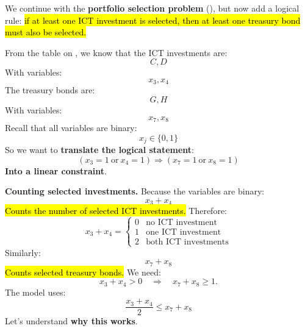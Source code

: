\begin{examplebox}
    We continue with the \textbf{portfolio selection problem} (), but now add a logical rule: \hl{if at least one ICT investment is selected, then at least one treasury bond must also be selected.}

    \highspace
    From the table on , we know that the ICT investments are:
    \begin{equation*}
        C,D
    \end{equation*}
    With variables:
    \begin{equation*}
        x_3,x_4
    \end{equation*}
    The treasury bonds are:
    \begin{equation*}
        G,H
    \end{equation*}
    With variables:
    \begin{equation*}
        x_7,x_8
    \end{equation*}
    Recall that all variables are binary:
    \begin{equation*}
        x_j\in\{0,1\}
    \end{equation*}
    So we want to \textbf{translate the logical statement}:
    \begin{equation*}
        (x_3=1\ \text{or}\ x_4=1)
        \Longrightarrow
        (x_7=1\ \text{or}\ x_8=1)
    \end{equation*}
    \textbf{Into a linear constraint}.

    \highspace
    \textcolor{Green3}{ \textbf{Counting selected investments.}} Because the variables are binary:
    \begin{equation*}
        x_3+x_4
    \end{equation*}
    \hl{Counts the number of selected ICT investments.} Therefore:
    \begin{equation*}
        x_3+x_4=
        \begin{cases}
            0 & \text{no ICT investment}\\
            1 & \text{one ICT investment}\\
            2 & \text{both ICT investments}
        \end{cases}
    \end{equation*}
    Similarly:
    \begin{equation*}
        x_7+x_8
    \end{equation*}
    \hl{Counts selected treasury bonds.} We need:
    \begin{equation*}
        x_3+x_4>0
        \quad\Longrightarrow\quad
        x_7+x_8\geq1.
    \end{equation*}
    The model uses:
    \begin{equation*}
        \boxed{
            \frac{x_3+x_4}{2}\leq x_7+x_8
        }
    \end{equation*}
    Let's understand \textbf{why this works}.


\end{examplebox}
